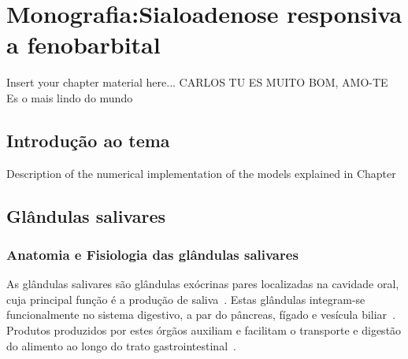 
\chapter{Monografia:Sialoadenose responsiva a fenobarbital}
\label{chapter:Monografia:Sialoadenose responsiva a fenobarbital}

Insert your chapter material here... CARLOS TU ES MUITO BOM, AMO-TE
Es o mais lindo do mundo 
\section{Introdução ao tema}
\label{section:Introdução ao tema}

Description of the numerical implementation of the models explained in Chapter

\section{Glândulas salivares}
\label{section:Glândulas salivares}

\subsection{Anatomia e Fisiologia das glândulas salivares}

As glândulas salivares são glândulas exócrinas pares localizadas na cavidade oral, cuja principal função é a produção de saliva~\cite{Mescher2018}. Estas glândulas integram-se funcionalmente no sistema digestivo, a par do pâncreas, fígado e vesícula biliar~\cite{Mescher2018}.  Produtos produzidos por estes órgãos auxiliam e facilitam o transporte e digestão do alimento ao longo do trato gastrointestinal~\cite{Mescher2018}. 

